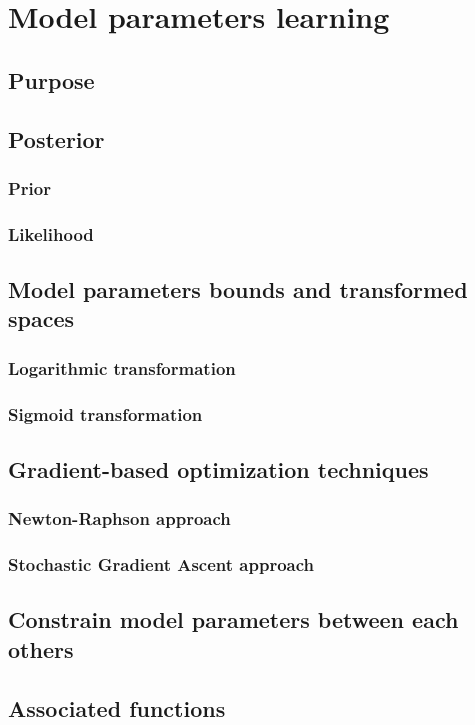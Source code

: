 \documentclass{book}
\begin{document}
\chapter{Model parameters learning}
\section{Purpose}
\section{Posterior}
\subsection{Prior}
\subsection{Likelihood}
\section{Model parameters bounds and transformed spaces}
\subsection{Logarithmic transformation}
\subsection{Sigmoid transformation}
\section{Gradient-based optimization techniques}
\subsection{Newton-Raphson approach}
\subsection{Stochastic Gradient Ascent approach}
\section{Constrain model parameters between each others}
\section{Associated functions}
\newpage
\end{document}
